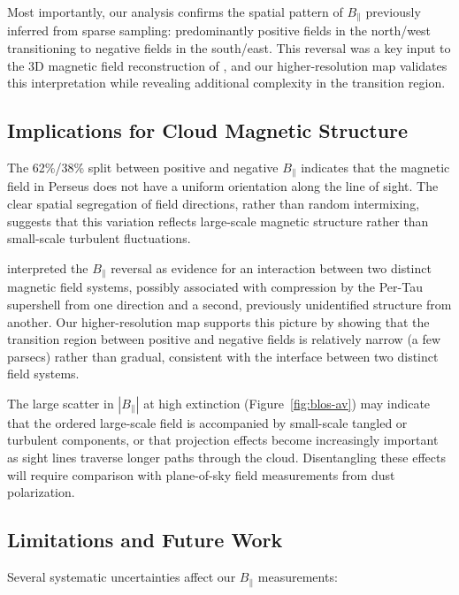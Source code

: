 \documentclass[twocolumn]{aastex701}
\begin{document}
Most importantly, our analysis confirms the spatial pattern of $B_\parallel$ previously inferred from sparse sampling: predominantly positive fields in the north/west transitioning to negative fields in the south/east. This reversal was a key input to the 3D magnetic field reconstruction of \citet{tahani2022b}, and our higher-resolution map validates this interpretation while revealing additional complexity in the transition region.

\subsection{Implications for Cloud Magnetic Structure}

The 62\%/38\% split between positive and negative $B_\parallel$ indicates that the magnetic field in Perseus does not have a uniform orientation along the line of sight. The clear spatial segregation of field directions, rather than random intermixing, suggests that this variation reflects large-scale magnetic structure rather than small-scale turbulent fluctuations.

\citet{tahani2022b} interpreted the $B_\parallel$ reversal as evidence for an interaction between two distinct magnetic field systems, possibly associated with compression by the Per-Tau supershell from one direction and a second, previously unidentified structure from another. Our higher-resolution map supports this picture by showing that the transition region between positive and negative fields is relatively narrow (a few parsecs) rather than gradual, consistent with the interface between two distinct field systems.

The large scatter in $|B_\parallel|$ at high extinction (Figure~\ref{fig:blos-av}) may indicate that the ordered large-scale field is accompanied by small-scale tangled or turbulent components, or that projection effects become increasingly important as sight lines traverse longer paths through the cloud. Disentangling these effects will require comparison with plane-of-sky field measurements from dust polarization.

\subsection{Limitations and Future Work}

Several systematic uncertainties affect our $B_\parallel$ measurements:
\end{document}
